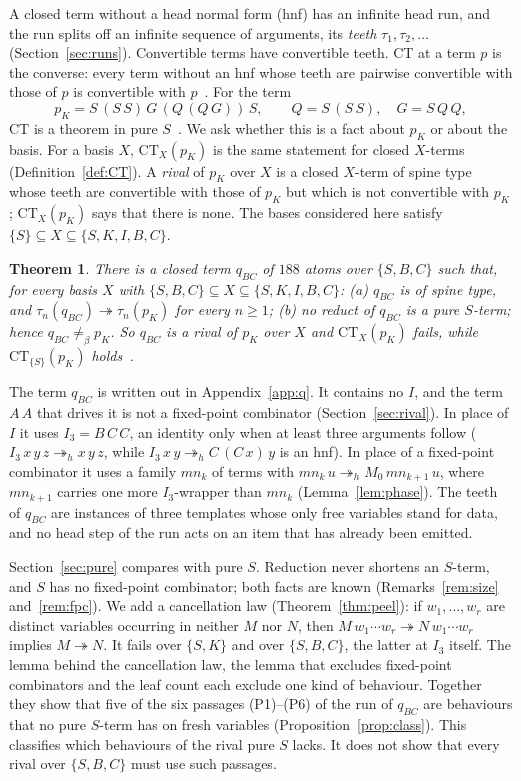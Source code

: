 \documentclass[11pt]{amsart}
\newtheorem{theorem}{Theorem}
\theoremstyle{definition}
\newcommand{\red}{\twoheadrightarrow}
\newcommand{\hred}{\twoheadrightarrow_h}
\newcommand{\nconv}{\neq_\beta}
\newcommand{\CT}{\mathrm{CT}}
\newcommand{\pK}{p_K}
\newcommand{\qBC}{q_{BC}}
\newcommand{\Ir}{I_3}
\newcommand{\Mz}{M_0}
\newcommand{\mn}{\mathit{mn}}
\begin{document}
A closed term without a head normal form (hnf) has an infinite head run, and the run splits off an
infinite sequence of arguments, its \emph{teeth} $\tau_1,\tau_2,\dots$ (Section~\ref{sec:runs}).
Convertible terms have convertible teeth. CT at a term $p$ is the converse: every term without an
hnf whose teeth are pairwise convertible with those of $p$ is convertible with
$p$~\citep[Definition~1]{s15}. For the term
\[
\pK=S\,(S\,S)\,G\,(Q\,(Q\,G))\,S,\qquad Q=S\,(S\,S),\quad G=S\,Q\,Q,
\]
CT is a theorem in pure $S$~\citep[Theorem~1]{s11}. We ask whether this is a fact about $\pK$ or about
the basis. For a basis $X$, $\CT_X(\pK)$ is the same statement for closed $X$-terms
(Definition~\ref{def:CT}). A \emph{rival} of $\pK$ over $X$ is a closed $X$-term of spine type whose
teeth are convertible with those of $\pK$ but which is not convertible with $\pK$; $\CT_X(\pK)$ says
that there is none. The bases considered here satisfy $\{S\}\subseteq X\subseteq\{S,K,I,B,C\}$.

\begin{theorem}\label{thm:main}
There is a closed term $\qBC$ of $188$ atoms over $\{S,B,C\}$ such that, for every basis $X$ with
$\{S,B,C\}\subseteq X\subseteq\{S,K,I,B,C\}$:
\textup{(a)} $\qBC$ is of spine type, and $\tau_n(\qBC)\red\tau_n(\pK)$ for every $n\ge1$;
\textup{(b)} no reduct of $\qBC$ is a pure $S$-term; hence $\qBC\nconv\pK$.
So $\qBC$ is a rival of $\pK$ over $X$ and $\CT_X(\pK)$ fails, while $\CT_{\{S\}}(\pK)$
holds~\citep[Theorem~1]{s11}.
\end{theorem}

The term $\qBC$ is written out in Appendix~\ref{app:q}. It contains no $I$, and the term $A\,A$ that
drives it is not a fixed-point combinator (Section~\ref{sec:rival}). In place of $I$ it uses
$\Ir=B\,C\,C$, an identity only when at least three arguments follow ($\Ir\,x\,y\,z\hred x\,y\,z$, while
$\Ir\,x\,y\hred C\,(C\,x)\,y$ is an hnf). In place of a fixed-point combinator it uses a family $\mn_k$
of terms with $\mn_k\,u\hred\Mz\,\mn_{k+1}\,u$, where $\mn_{k+1}$ carries one more $\Ir$-wrapper than
$\mn_k$ (Lemma~\ref{lem:phase}). The teeth of $\qBC$ are instances of three templates whose only free
variables stand for data, and no head step of the run acts on an item that has already been emitted.

Section~\ref{sec:pure} compares with pure $S$. Reduction never shortens an $S$-term, and $S$ has no
fixed-point combinator; both facts are known (Remarks~\ref{rem:size} and~\ref{rem:fpc}). We add a
cancellation law (Theorem~\ref{thm:peel}): if $w_1,\dots,w_r$ are distinct variables occurring in neither
$M$ nor $N$, then $M\,w_1\cdots w_r\red N\,w_1\cdots w_r$ implies $M\red N$. It fails over $\{S,K\}$ and
over $\{S,B,C\}$, the latter at $\Ir$ itself. The lemma behind the cancellation law, the lemma that
excludes fixed-point combinators and the leaf count each exclude one kind of behaviour. Together they
show that five of the six passages (P1)--(P6) of the run of $\qBC$ are behaviours that no pure $S$-term
has on fresh variables (Proposition~\ref{prop:class}). This classifies which behaviours of the rival
pure $S$ lacks. It does not show that every rival over $\{S,B,C\}$ must use such passages.
\end{document}
